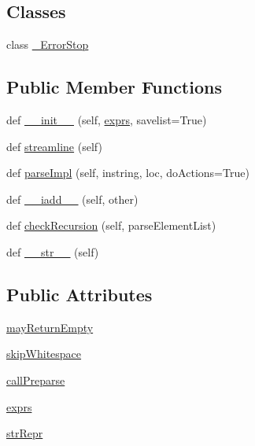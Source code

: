 \subsection*{Classes}
\begin{DoxyCompactItemize}
\item 
class \hyperlink{classpip_1_1__vendor_1_1pyparsing_1_1And_1_1__ErrorStop}{\+\_\+\+Error\+Stop}
\end{DoxyCompactItemize}
\subsection*{Public Member Functions}
\begin{DoxyCompactItemize}
\item 
def \hyperlink{classpip_1_1__vendor_1_1pyparsing_1_1And_a83632fa6cb44efd158f0c82ec13cca0b}{\+\_\+\+\_\+init\+\_\+\+\_\+} (self, \hyperlink{classpip_1_1__vendor_1_1pyparsing_1_1And_ae47a3bb965313632c35af5a5be35e96f}{exprs}, savelist=True)
\item 
def \hyperlink{classpip_1_1__vendor_1_1pyparsing_1_1And_abe50611492ed4fc35014a4ac621814b1}{streamline} (self)
\item 
def \hyperlink{classpip_1_1__vendor_1_1pyparsing_1_1And_aa2df02d7b498397033a1eddfa4c0917b}{parse\+Impl} (self, instring, loc, do\+Actions=True)
\item 
def \hyperlink{classpip_1_1__vendor_1_1pyparsing_1_1And_aed06063711527027f539322ed846dfdd}{\+\_\+\+\_\+iadd\+\_\+\+\_\+} (self, other)
\item 
def \hyperlink{classpip_1_1__vendor_1_1pyparsing_1_1And_a09c80e72c4ffe432c83244c517e5bcbf}{check\+Recursion} (self, parse\+Element\+List)
\item 
def \hyperlink{classpip_1_1__vendor_1_1pyparsing_1_1And_a06929895338de1f38e714c7f00e715e4}{\+\_\+\+\_\+str\+\_\+\+\_\+} (self)
\end{DoxyCompactItemize}
\subsection*{Public Attributes}
\begin{DoxyCompactItemize}
\item 
\hyperlink{classpip_1_1__vendor_1_1pyparsing_1_1And_a6a9fa4bbf41a0b8cdc1689639c55ee98}{may\+Return\+Empty}
\item 
\hyperlink{classpip_1_1__vendor_1_1pyparsing_1_1And_a5f64986644797d793288731d9773ac2d}{skip\+Whitespace}
\item 
\hyperlink{classpip_1_1__vendor_1_1pyparsing_1_1And_a994f28f665e14776f33969bb2e4e7234}{call\+Preparse}
\item 
\hyperlink{classpip_1_1__vendor_1_1pyparsing_1_1And_ae47a3bb965313632c35af5a5be35e96f}{exprs}
\item 
\hyperlink{classpip_1_1__vendor_1_1pyparsing_1_1And_a8128663abb722f0c453630135c44c0c0}{str\+Repr}
\end{DoxyCompactItemize}

